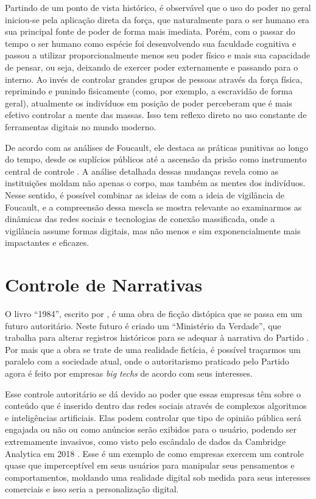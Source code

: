 \documentclass[
	12pt,
	openright,
	twoside,
	a4paper,
	english,
	french,
	spanish,
	brazil
]{abntex2}
\begin{document}
  Partindo de um ponto de vista histórico, é observável que o uso do poder no
  geral iniciou-se pela aplicação direta da força, que naturalmente para o ser
  humano era sua principal fonte de poder de forma mais imediata. Porém, com o
  passar do tempo o ser humano como espécie foi desenvolvendo sua faculdade
  cognitiva e passou a utilizar proporcionalmente menos seu poder físico e mais
  sua capacidade de pensar, ou seja, deixando de exercer poder externamente e
  passando para o interno. Ao invés de controlar grandes grupos de pessoas
  através da força física, reprimindo e punindo fisicamente (como, por exemplo,
  a escravidão de forma geral), atualmente os indivíduos em posição de poder
  perceberam que é mais efetivo controlar a mente das massas. Isso tem reflexo
  direto no uso constante de ferramentas digitais no mundo moderno.

  De acordo com as análises de Foucault, ele destaca as práticas punitivas ao
  longo do tempo, desde os suplícios públicos até a ascensão da prisão como
  instrumento central de controle \cite{foucault-vigiar-punir}. A análise
  detalhada dessas mudanças revela como as instituições moldam não apenas o
  corpo, mas também as mentes dos indivíduos. Nesse sentido, é possível combinar
  as ideias de  com a ideia de
  vigilância de Foucault, e a compreensão dessa mescla se mostra relevante ao
  examinarmos as dinâmicas das redes sociais e tecnologias de conexão
  massificada, onde a vigilância assume formas digitais, mas não menos e sim
  exponencialmente mais impactantes e eficazes.

  \newpage

  \section{Controle de Narrativas}

  O livro ``1984'', escrito por , é uma obra de
  ficção distópica que se passa em um futuro autoritário. Neste futuro é criado
  um ``Ministério da Verdade'', que trabalha para alterar registros históricos
  para se adequar à narrativa do Partido \cite{orwell-1984}. Por mais que a obra
  se trate de uma realidade fictícia, é possível traçarmos um paralelo com a
  sociedade atual, onde o autoritarismo praticado pelo Partido agora é feito por
  empresas \textit{big techs} de acordo com seus interesses.

  Esse controle autoritário se dá devido ao poder que essas empresas têm sobre o
  conteúdo que é inserido dentro das redes sociais através de complexos
  algoritmos e inteligências artificiais. Elas podem controlar que tipo de
  opinião pública será engajada ou não ou como anúncios serão exibidos para o
  usuário, podendo ser extremamente invasivos, como visto pelo escândalo de
  dados da Cambridge Analytica em 2018 \cite{chan-cambridge-analytica}. Esse é
  um exemplo de como empresas exercem um controle quase que imperceptível em
  seus usuários para manipular seus pensamentos e comportamentos, moldando uma
  realidade digital sob medida para seus interesses comerciais e isso seria a
  personalização digital.
\end{document}
